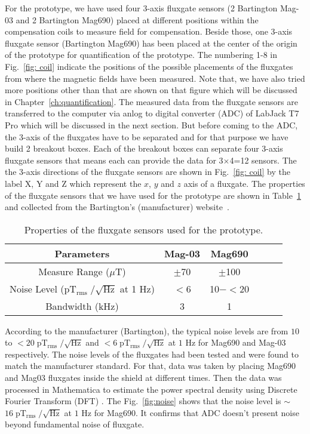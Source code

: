 For the prototype, we have used four 3-axis fluxgate sensors (2 Bartington Mag-03 and 2 Bartington Mag690) placed at different positions within the compensation coils to measure field for compensation. Beside those, one 3-axis fluxgate sensor (Bartington Mag690) has been placed at the center of the origin of the prototype for quantification of the prototype. The numbering 1-8 in Fig.~\ref{fig: coil} indicate the positions of the possible placements of the fluxgates from where the magnetic fields have been measured. Note that, we have also tried more positions other than that are shown on that figure which will be discussed in Chapter~\ref{ch:quantification}.  The measured data from the fluxgate sensors are transferred to the computer via anlog to digital converter (ADC) of LabJack T7 Pro which will be discussed in the next section. But before coming to the ADC, the 3-axis of the fluxgates have to be separated and for that purpose we have build  2 breakout boxes. Each of the breakout boxes can separate four 3-axis fluxgate sensors that means each can provide the data for 3$\times$4=12 sensors. The the 3-axis directions of the fluxgate sensors are shown in Fig.~\ref{fig: coil} by the label X, Y and Z which represent the $x$, $y$ and $z$ axis of a fluxgate.  The properties of the fluxgate sensors that we have used for the prototype are shown in Table~\ref{tablE:sensor} and collected from the Bartington's (manufacturer) website~\cite{flux}. 

\begin{table} [!htb]
    \centering
    \begin{tabular} { |c|c|c|c|c|c|} 
        \hline
        Parameters & Mag-03 & Mag690 \\
        \hline\hline
        Measure Range ($\mu$T) & $\pm$70 & $\pm$100 \\ 
        \hline
        \makecell{Noise Level \\($\mathrm{pT_{rms}\;/\sqrt{Hz}}$ at 1 Hz)} & $<$6 & 10$-<$20 \\ 
        \hline
        Bandwidth (kHz) & 3 & 1 \\ 
        \hline

    \end{tabular}
    \caption{Properties of the fluxgate sensors used for the prototype.}\label{tablE:sensor}
\end{table}

\FloatBarrier
According to the manufacturer (Bartington), the typical noise levels are from $\mathrm{10}$ to $\mathrm{<20\;pT_{rms}\;/\sqrt{Hz}}$ and $\mathrm{<6 \; pT_{rms} \;/\sqrt{Hz}}$ at $\mathrm{1}$ Hz for Mag690 and Mag-03 respectively. The noise levels of the fluxgates had been tested  and were found to match the manufacturer standard. For that, data was taken by placing Mag690 and Mag03 fluxgates inside the shield at different times. Then the data was processed in Mathematica \cite{Mathematica} to estimate the power spectral density using Discrete Fourier Transform (DFT) \cite{dft}. The Fig.~\ref{fig:noise} shows that the noise level is $\sim$ $\mathrm{16\;pT_{rms}\;/\sqrt{Hz}}$ at $\mathrm{1}$ Hz for Mag690. It confirms that ADC doesn't present noise beyond fundamental noise of fluxgate.

